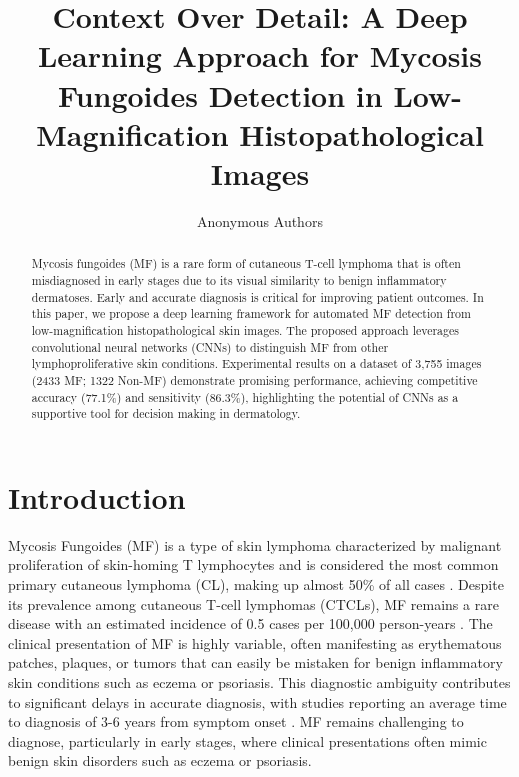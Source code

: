 \documentclass[runningheads]{llncs}
\begin{document}
\title{Context Over Detail: A Deep Learning Approach for Mycosis Fungoides Detection in Low-Magnification Histopathological Images}

\author{Anonymous Authors}

\maketitle

\begin{abstract}
Mycosis fungoides (MF) is a rare form of cutaneous T-cell lymphoma that is often misdiagnosed in early stages due to its visual similarity to benign inflammatory dermatoses. Early and accurate diagnosis is critical for improving patient outcomes. In this paper, we propose a deep learning framework for automated MF detection from low-magnification histopathological skin images. The proposed approach leverages convolutional neural networks (CNNs) to distinguish MF from other lymphoproliferative skin conditions. Experimental results on a dataset of 3,755 images (2433 MF; 1322 Non-MF) demonstrate promising performance, achieving competitive accuracy (77.1\%) and sensitivity (86.3\%), highlighting the potential of CNNs as a supportive tool for decision making in dermatology.

\end{abstract}

\section{Introduction}
Mycosis Fungoides (MF) is a type of skin lymphoma characterized by malignant proliferation of skin-homing T lymphocytes and is considered the most common primary cutaneous lymphoma (CL), making up almost 50\% of all cases \cite{willemze2005}. Despite its prevalence among cutaneous T-cell lymphomas (CTCLs), MF remains a rare disease with an estimated incidence of 0.5 cases per 100,000 person-years \cite{willemze2005}. The clinical presentation of MF is highly variable, often manifesting as erythematous patches, plaques, or tumors that can easily be mistaken for benign inflammatory skin conditions such as eczema or psoriasis. This diagnostic ambiguity contributes to significant delays in accurate diagnosis, with studies reporting an average time to diagnosis of 3-6 years from symptom onset \cite{beatty2025_early_mf_diagnosis}. MF remains challenging to diagnose, particularly in early stages, where clinical presentations often mimic benign skin disorders such as eczema or psoriasis.
\end{document}
